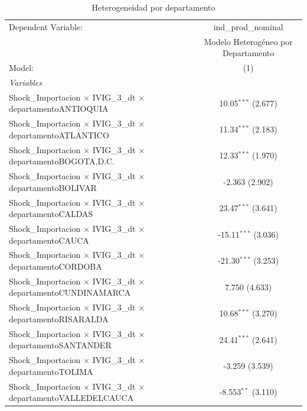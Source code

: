 \documentclass[12pt]{article}
\begin{document}
\begin{table}[htbp]
\centering
\begin{threeparttable}

   \caption{Heterogeneidad por departamento}
   \centering
   \small
   \begin{tabular}{lc}
      \tabularnewline \midrule \midrule
      Dependent Variable:                                                             & ind\_prod\_nominal\\    
                                                                                      & Modelo Heterogéneo por Departamento \\   
      Model:                                                                          & (1)\\  
      \midrule
      \emph{Variables}\\
      Shock\_Importacion $\times$ IVIG\_3\_dt $\times$ departamentoANTIOQUIA          & 10.05$^{***}$ (2.677)\\   
      Shock\_Importacion $\times$ IVIG\_3\_dt $\times$ departamentoATLANTICO          & 11.34$^{***}$ (2.183)\\   
      Shock\_Importacion $\times$ IVIG\_3\_dt $\times$ departamentoBOGOTA,D.C.        & 12.33$^{***}$ (1.970)\\   
      Shock\_Importacion $\times$ IVIG\_3\_dt $\times$ departamentoBOLIVAR            & -2.363 (2.902)\\   
      Shock\_Importacion $\times$ IVIG\_3\_dt $\times$ departamentoCALDAS             & 23.47$^{***}$ (3.641)\\   
      Shock\_Importacion $\times$ IVIG\_3\_dt $\times$ departamentoCAUCA              & -15.11$^{***}$ (3.036)\\   
      Shock\_Importacion $\times$ IVIG\_3\_dt $\times$ departamentoCORDOBA            & -21.30$^{***}$ (3.253)\\   
      Shock\_Importacion $\times$ IVIG\_3\_dt $\times$ departamentoCUNDINAMARCA       & 7.750 (4.633)\\   
      Shock\_Importacion $\times$ IVIG\_3\_dt $\times$ departamentoRISARALDA          & 10.68$^{***}$ (3.270)\\   
      Shock\_Importacion $\times$ IVIG\_3\_dt $\times$ departamentoSANTANDER          & 24.41$^{***}$ (2.641)\\   
      Shock\_Importacion $\times$ IVIG\_3\_dt $\times$ departamentoTOLIMA             & -3.259 (3.539)\\   
      Shock\_Importacion $\times$ IVIG\_3\_dt $\times$ departamentoVALLEDELCAUCA      & -8.553$^{**}$ (3.110)\\   

\end{tabular}
\end{threeparttable}
\end{table}
\end{document}
